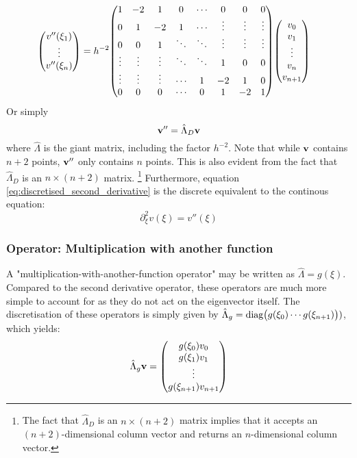 \documentclass[reprint,english]{revtex4-1}
\begin{document}
\begin{align*}
\mqty(v''(\xi_1)\\\vdots\\v''(\xi_n)) &= h^{-2}
\mqty(1      & -2      & 1       & 0      & \cdots &  0       & 0        & 0      \\
      0      &  1      & -2      & 1      & \cdots &  \vdots  & \vdots   & \vdots \\
      0      &  0      & 1       & \ddots & \ddots &  \vdots  & \vdots   & \vdots \\
      \vdots &  \vdots & \vdots  & \ddots & \ddots &  1       &  0       & 0      \\
      \vdots &  \vdots & \vdots  & \cdots & 1      & -2       &  1       & 0      \\
      0      &  0      & 0       & \cdots & 0      & 1        &  -2      & 1       )
\mqty(v_0\\v_1\\\vdots\\v_n\\v_{n+1})
\end{align*}
Or simply
\begin{equation}\label{eq:discretised_second_derivative}
\vb{v}''=\hat{\Lambda}_D\vb{v}
\end{equation}
where \(\hat{\Lambda}\) is the giant matrix, including the factor \(h^{-2}\). Note that while \(\vb{v}\) contains \(n+2\) points, \(\vb{v}''\) only contains \(n\) points. This is also evident from the fact that \(\hat{\Lambda}_D\) is an \(n\times(n+2)\) matrix. \footnote{The fact that \(\hat{\Lambda}_D\) is an \(n\times(n+2)\) matrix implies that it accepts an \((n+2)\)-dimensional column vector and returns an \(n\)-dimensional column vector.} Furthermore, equation \eqref{eq:discretised_second_derivative} is the discrete equivalent to the continous equation:
\[\partial_\xi^2v(\xi)=v''(\xi)\]
\subsubsection{Operator: Multiplication with another function}
A "multiplication-with-another-function operator" may be written as \(\hat{\Lambda}=g(\xi)\). Compared to the second derivative operator, these operators are much more simple to account for as they do not act on the eigenvector itself. The discretisation of these operators is simply given by \(\hat{\Lambda}_g=\text{diag}\mqty(g(\xi_0)\cdots g(\xi_{n+1})))\), which yields:
\begin{equation}
\hat{\Lambda}_g\vb{v}=\mqty(g(\xi_0)v_0\\g(\xi_1)v_1\\\vdots\\g(\xi_{n+1})v_{n+1})
\end{equation}
\end{document}

